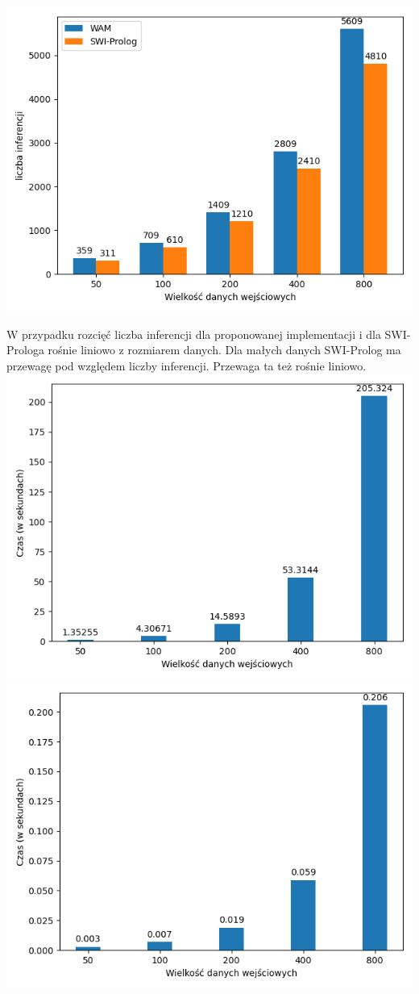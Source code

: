 \includegraphics{concati.png}

W przypadku rozcięć liczba inferencji dla proponowanej implementacji i dla SWI-Prologa rośnie liniowo z rozmiarem danych. Dla małych danych SWI-Prolog ma przewagę pod względem liczby inferencji. Przewaga ta też rośnie liniowo.\\

\includegraphics{concattw.png}
\includegraphics{concatts.png}

